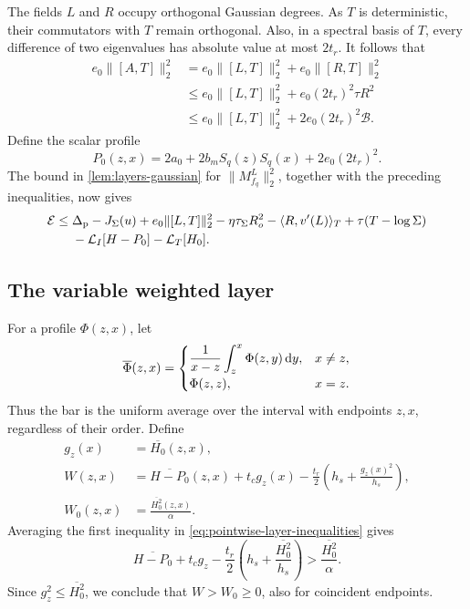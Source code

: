 The fields $L$ and $R$ occupy orthogonal Gaussian degrees. As $T$ is deterministic, their commutators with $T$ remain orthogonal.  Also, in a spectral basis of $T$, every difference of two eigenvalues has absolute value at most $2t_r$. It follows that
\[
 \begin{aligned}
 e_0\|[A,T]\|_2^2
 &=e_0\|[L,T]\|_2^2+e_0\|[R,T]\|_2^2\\
 &\le e_0\|[L,T]\|_2^2+e_0(2t_r)^2\tau R^2\\
 &\le e_0\|[L,T]\|_2^2+2e_0(2t_r)^2\mathcal{B}.
 \end{aligned}
\]
Define the scalar profile
\[
 P_0(z,x)=2a_0+2b_mS_q(z)S_q(x)+2e_0(2t_r)^2.
\]
The bound in \cref{lem:layers-gaussian} for $\|M_{f_q}^L\|_2^2$, together with the preceding inequalities, now gives
\begin{equation}
 \begin{aligned}
 \mathcal{E}\le{}&
 \Delta_{\rm p}-J_\Sigma(u)+e_0\|[L,T]\|_2^2
 -\eta\tau_\Sigma R_o^2-\langle R,v'(L)\rangle_T
 +\tau(T-\log\Sigma)\\
 &-\mathcal{L}_I[H-P_0]-\mathcal{L}_T[H_0].
 \end{aligned}
 \label{eq:entropy-decomposition}
\end{equation}

\subsection{The variable weighted layer}

For a profile $\Phi(z,x)$, let
\[
 \overline{\Phi}(z,x)=
 \begin{cases}
  \displaystyle\frac1{x-z}\int_z^x\Phi(z,y)\,\mathrm{d} y,&x\ne z,\\[2mm]
  \Phi(z,z),&x=z.
 \end{cases}
\]
Thus the bar is the uniform average over the interval with endpoints $z,x$, regardless of their order. Define
\[
 \begin{aligned}
 g_z(x)&=\overline{H_0}(z,x),\\
 W(z,x)&=\overline{H-P_0}(z,x)+t_cg_z(x)
       -\frac{t_r}{2}\left(h_s+\frac{g_z(x)^2}{h_s}\right),\\
 W_0(z,x)&=\frac{\overline{H_0^2}(z,x)}{\alpha}.
 \end{aligned}
\]
Averaging the first inequality in \eqref{eq:pointwise-layer-inequalities} gives
\[
 \overline{H-P_0}+t_cg_z
 -\frac{t_r}{2}\left(h_s+\frac{\overline{H_0^2}}{h_s}\right)
 >\frac{\overline{H_0^2}}{\alpha}.
\]
Since $g_z^2\le\overline{H_0^2}$, we conclude that $W>W_0\ge0$, also for coincident endpoints.

